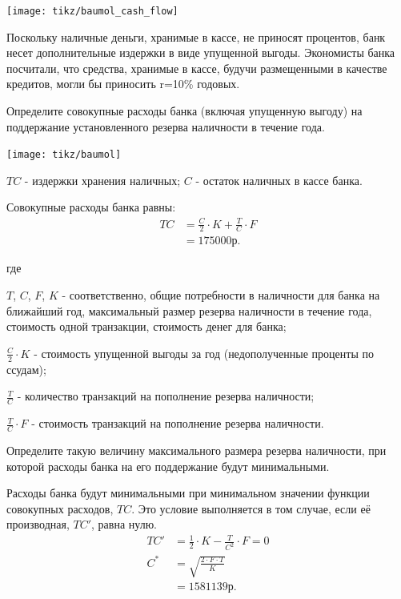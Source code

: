 \documentclass[12pt, table, a4paper,twoside]{exam}
\begin{document}
\begin{questions}
		\centering
\texttt{[image: tikz/baumol\_cash\_flow]}

\raggedright

Поскольку наличные деньги, хранимые в кассе,  не приносят процентов, банк несет дополнительные издержки в виде упущенной выгоды. Экономисты банка посчитали, что средства,  хранимые в кассе, будучи размещенными в качестве кредитов, могли бы приносить r=10\% годовых.
\noaddpoints

\begin{subparts}
	\subpart[8] Определите совокупные расходы банка (включая упущенную выгоду) на поддержание установленного резерва наличности в течение года.

	\begin{solution}[12em]
				
		\centering
		\texttt{[image: tikz/baumol]}

		\raggedright
		
	$TC$ - издержки хранения наличных; $C$ - остаток наличных в кассе банка.	

	Совокупные расходы банка равны:
	\begin{align}
	TC&=\frac{C}{2}\cdot K + \frac{T}{C} \cdot F \\
	&= 175000\text{р.}\nonumber
	\end{align}	
	
	где
	
	$T$, $C$, $F$, $K$ - соответственно, общие потребности в наличности для банка на ближайший год, максимальный размер резерва наличности в течение года, стоимость одной транзакции, стоимость денег для банка;
	
	$\frac{C}{2}\cdot K$ - стоимость упущенной выгоды за год (недополученные проценты по ссудам);
	
	$\frac{T}{C}$ - количество транзакций на пополнение резерва наличности;
	
	$\frac{T}{C} \cdot F$ - стоимость транзакций на пополнение резерва наличности.
	\end{solution}
	
	\subpart[10] 	Определите такую величину максимального размера резерва наличности, при которой расходы банка на его поддержание будут минимальными. 
		
	\begin{solution}[12em]
		Расходы банка будут минимальными при минимальном значении функции совокупных расходов, $TC$. Это условие выполняется в том случае, если её производная, $TC'$, равна нулю.
		\begin{align}
		TC'&=\frac{1}{2} \cdot K - \frac{T}{C^2} \cdot F = 0\\
		C^*&=\sqrt{\frac{2 \cdot F \cdot T}{K}}\\
		&=1581139\text{р.}\nonumber
		\end{align}
		

\end{solution}
\end{subparts}
\end{questions}
\end{document}
